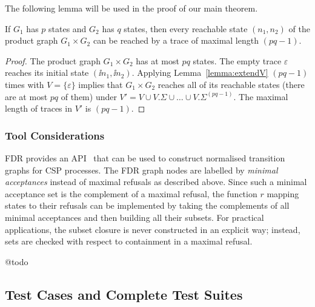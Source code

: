 The following lemma will be used in the proof of our main theorem.
\begin{lemma}\label{lemma:reachproduc}
If $G_1$ has $p$ states and $G_2$ has $q$ states, then every reachable state
$(n_1,n_2)$ of the product graph $G_1\times G_2$ can be reached by a trace
of maximal length $(pq-1)$.
\end{lemma}
\begin{proof}
The product graph $G_1\times G_2$ has at most $pq$ states. The empty trace $\varepsilon$
reaches its initial state $(\ii n_1,\ii n_2)$. Applying Lemma~\ref{lemma:extendV}
$(pq-1)$ times with $V=\{\varepsilon \}$ implies that $G_1\times G_2$ reaches
all of its reachable states (there are at most $pq$ of them) under
$V' = V \cup V.\Sigma\cup\dots \cup V.\Sigma^{(pq-1)}$. The maximal length of traces in
$V'$ is $(pq-1)$.
\xbox
\end{proof}


\subsubsection*{Tool Considerations}
FDR provides an API~\cite{fdrmanual} that can be used to construct normalised
transition graphs for CSP processes. The FDR graph nodes are labelled by
\emph{minimal acceptances} instead of maximal refusals as described above.
Since such a minimal acceptance set is the complement of a maximal refusal,
the function $r$ mapping states to their refusals can be implemented by
taking the complements of all minimal acceptances and then building all their
subsets. For practical applications, the subset closure is never constructed
in an explicit way; instead, sets are checked with respect to containment in
a maximal refusal.

@todo


\subsection{Test Cases and Complete Test Suites}
\label{sec:cspcompletedef}

